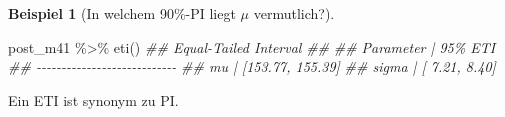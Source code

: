 \documentclass[
  a4paper,
  DIV=11]{scrreprt}
\newenvironment{Shaded}{\begin{snugshade}}{\end{snugshade}}
\newcommand{\DocumentationTok}[1]{\textcolor[rgb]{0.37,0.37,0.37}{\textit{#1}}}
\newcommand{\FunctionTok}[1]{\textcolor[rgb]{0.28,0.35,0.67}{#1}}
\newcommand{\NormalTok}[1]{\textcolor[rgb]{0.00,0.23,0.31}{#1}}
\newcommand{\SpecialCharTok}[1]{\textcolor[rgb]{0.37,0.37,0.37}{#1}}
\theoremstyle{definition}
\newtheorem{example}{Beispiel}[chapter]
\theoremstyle{remark}
\begin{document}
\leavevmode{}%
\begin{example}[In welchem 90\%-PI liegt \(\mu\)
vermutlich?]\label{exm-kung4}

\begin{Shaded}
\begin{Highlighting}[]
\NormalTok{post\_m41 }\SpecialCharTok{\%\textgreater{}\%} 
  \FunctionTok{eti}\NormalTok{()}
\DocumentationTok{\#\# Equal{-}Tailed Interval}
\DocumentationTok{\#\# }
\DocumentationTok{\#\# Parameter |          95\% ETI}
\DocumentationTok{\#\# {-}{-}{-}{-}{-}{-}{-}{-}{-}{-}{-}{-}{-}{-}{-}{-}{-}{-}{-}{-}{-}{-}{-}{-}{-}{-}{-}{-}}
\DocumentationTok{\#\# mu        | [153.77, 155.39]}
\DocumentationTok{\#\# sigma     | [  7.21,   8.40]}
\end{Highlighting}
\end{Shaded}

Ein ETI ist synonym zu PI.

\end{example}
\end{document}
